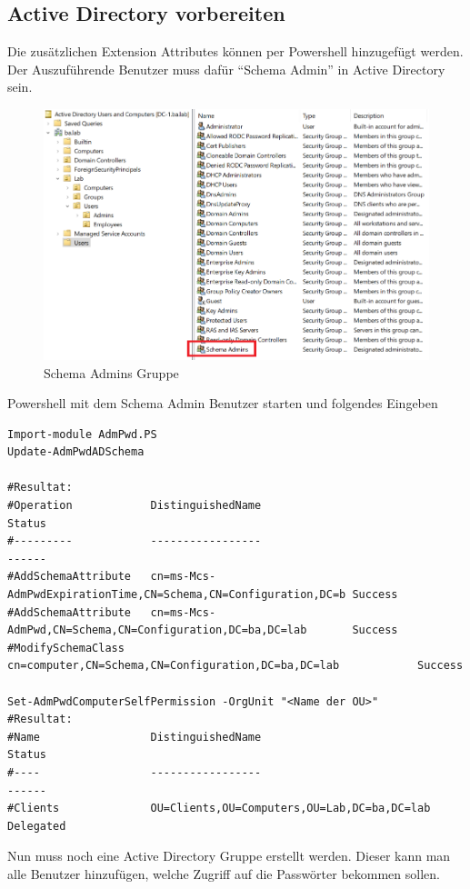 \subsection{Active Directory vorbereiten}
Die zusätzlichen Extension Attributes können per Powershell hinzugefügt werden.
Der Auszuführende Benutzer muss dafür ``Schema Admin'' in Active Directory sein.\\
\begin{figure}[H]
    \centering
    \includegraphics[width=0.7\linewidth]{../img/LAPS/schema-admins.png}
    \caption{Schema Admins Gruppe}
\end{figure}

Powershell mit dem Schema Admin Benutzer starten und folgendes Eingeben
\begin{lstlisting}
Import-module AdmPwd.PS
Update-AdmPwdADSchema

#Resultat:
#Operation            DistinguishedName                                              Status
#---------            -----------------                                              ------
#AddSchemaAttribute   cn=ms-Mcs-AdmPwdExpirationTime,CN=Schema,CN=Configuration,DC=b Success
#AddSchemaAttribute   cn=ms-Mcs-AdmPwd,CN=Schema,CN=Configuration,DC=ba,DC=lab       Success
#ModifySchemaClass    cn=computer,CN=Schema,CN=Configuration,DC=ba,DC=lab            Success

Set-AdmPwdComputerSelfPermission -OrgUnit "<Name der OU>"
#Resultat:
#Name                 DistinguishedName                                              Status
#----                 -----------------                                              ------
#Clients              OU=Clients,OU=Computers,OU=Lab,DC=ba,DC=lab                    Delegated
\end{lstlisting}

Nun muss noch eine Active Directory Gruppe erstellt werden.
Dieser kann man alle Benutzer hinzufügen, welche Zugriff auf die Passwörter bekommen sollen.

